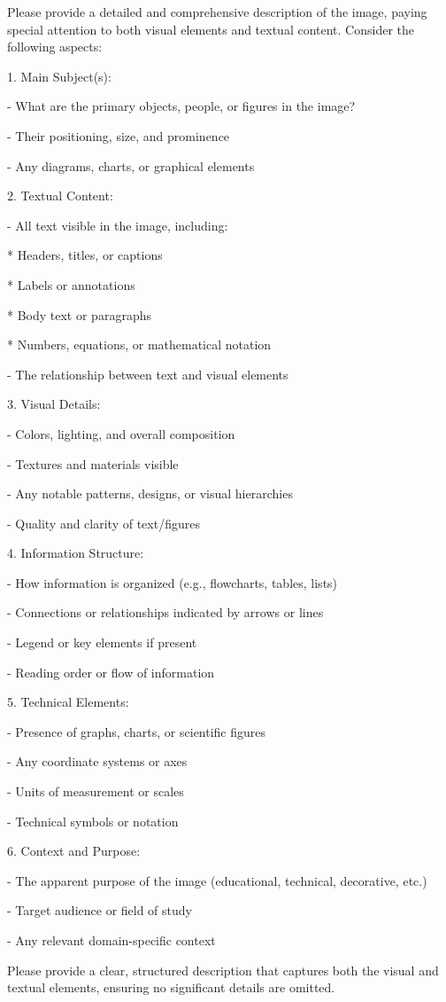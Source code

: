 \begin{tcolorbox}[size=title,opacityfill=0.05,breakable]
\noindent
Please provide a detailed and comprehensive description of the image, paying special attention to both visual elements and textual content. Consider the following aspects:

1. Main Subject(s):

   - What are the primary objects, people, or figures in the image?
   
   - Their positioning, size, and prominence
   
   - Any diagrams, charts, or graphical elements
   

2. Textual Content:

   - All text visible in the image, including:
   
     * Headers, titles, or captions
     
     * Labels or annotations
     
     * Body text or paragraphs
     
     * Numbers, equations, or mathematical notation
     
   - The relationship between text and visual elements

3. Visual Details:

   - Colors, lighting, and overall composition
   
   - Textures and materials visible
   
   - Any notable patterns, designs, or visual hierarchies
   
   - Quality and clarity of text/figures

4. Information Structure:

   - How information is organized (e.g., flowcharts, tables, lists)
   
   - Connections or relationships indicated by arrows or lines
   
   - Legend or key elements if present
   
   - Reading order or flow of information

5. Technical Elements:

   - Presence of graphs, charts, or scientific figures
   
   - Any coordinate systems or axes
   
   - Units of measurement or scales
   
   - Technical symbols or notation

6. Context and Purpose:

   - The apparent purpose of the image (educational, technical, decorative, etc.)
   
   - Target audience or field of study
   
   - Any relevant domain-specific context

Please provide a clear, structured description that captures both the visual and textual elements, ensuring no significant details are omitted.
\end{tcolorbox}

